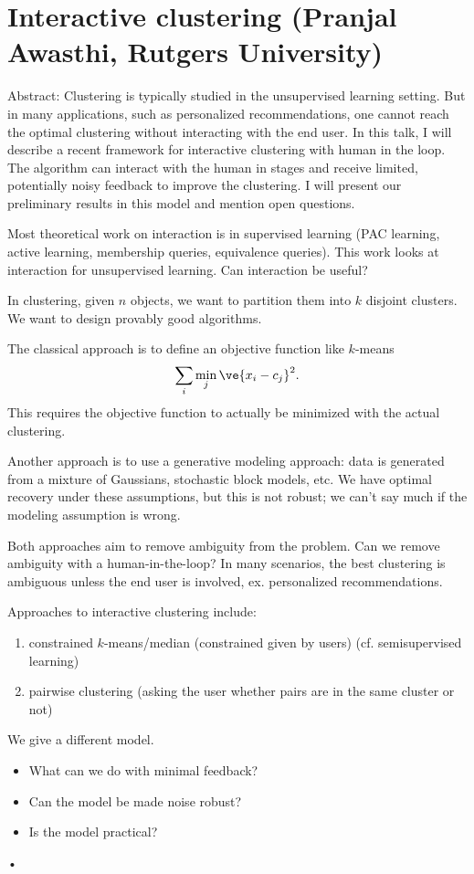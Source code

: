 \section{Interactive clustering (Pranjal Awasthi, Rutgers University)}

Abstract: Clustering is typically studied in the unsupervised learning setting. But in many applications, such as personalized recommendations, one cannot reach the optimal clustering without interacting with the end user. In this talk, I will describe a recent framework for interactive clustering with human in the loop. The algorithm can interact with the human in stages and receive limited, potentially noisy feedback to improve the clustering. I will present our preliminary results in this model and mention open questions.

Most theoretical work on interaction is in supervised learning (PAC learning, active learning, membership queries, equivalence queries). This work looks at interaction  for unsupervised learning. Can interaction be useful?

In clustering, given $n$ objects, we want to partition them into $k$ disjoint clusters. We want to design provably good algorithms. 

The classical approach is to define an objective function like $k$-means
$$
\sum_i \min_j \ve{x_i-c_j}^2.
$$
This requires the objective function to actually be minimized with the actual clustering.

Another approach is to use a generative modeling approach: data is generated from a mixture of Gaussians, stochastic block models, etc. We have optimal recovery under these assumptions, but this is not robust; we can't say much if the modeling assumption is wrong.

Both approaches aim to remove ambiguity from the problem. Can we remove ambiguity with a human-in-the-loop?
In many scenarios, the best clustering is ambiguous unless the end user is involved, ex. personalized recommendations.

Approaches to interactive clustering include:
\begin{enumerate}
\item
constrained $k$-means/median (constrained given by users) (cf. semisupervised learning)
\item
pairwise clustering  (asking the user whether pairs are in the same cluster or not)
\end{enumerate}
We give a different model.
\begin{itemize}
\item
What can we do with minimal feedback?
\item
Can the model be made noise robust? 
\item
Is the model practical?
\end{itemize}•

